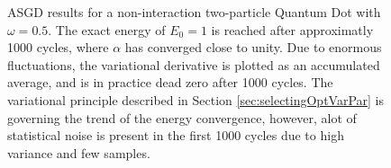 \begin{figure}
 \begin{center}
  \caption{ASGD results for a non-interaction two-particle Quantum Dot with $\omega=0.5$. The exact energy of $E_0=1$ is reached after approximatly 1000 cycles, where $\alpha$ has converged close to unity. Due to enormous fluctuations, the variational derivative is plotted as an accumulated average, and is in practice dead zero after 1000 cycles. The variational principle described in Section \ref{sec:selectingOptVarPar} is governing the trend of the energy convergence, however, alot of statistical noise is present in the first 1000 cycles due to high variance and few samples.}
  \label{fig:ASGD_nonint}
 \end{center}
\end{figure}

